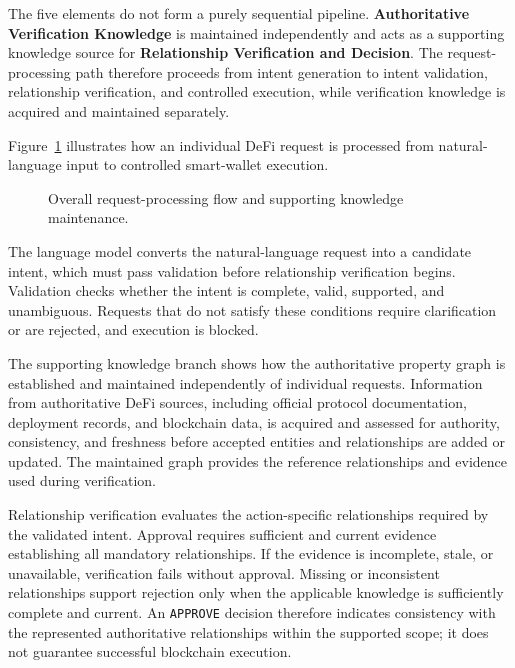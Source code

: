 The five elements do not form a purely sequential pipeline.
\textbf{Authoritative Verification Knowledge} is maintained independently and
acts as a supporting knowledge source for
\textbf{Relationship Verification and Decision}. The request-processing path
therefore proceeds from intent generation to intent validation, relationship
verification, and controlled execution, while verification knowledge is
acquired and maintained separately.

Figure~\ref{fig:overall_system_flow} illustrates how an individual DeFi
request is processed from natural-language input to controlled smart-wallet
    execution. 

\begin{figure}[H]
    \centering
    \resizebox{0.90\textwidth}{!}{%
    }
    \caption{Overall request-processing flow and supporting knowledge
    maintenance.}
    \label{fig:overall_system_flow}
\end{figure}
The language model converts the natural-language
request into a candidate intent, which must pass validation before
relationship verification begins. Validation checks whether the intent is
complete, valid, supported, and unambiguous. Requests that do not satisfy
these conditions require clarification or are rejected, and execution is
blocked.


The supporting knowledge branch shows how the authoritative property graph
is established and maintained independently of individual requests.
Information from authoritative DeFi sources, including official protocol
documentation, deployment records, and blockchain data, is acquired and
assessed for authority, consistency, and freshness before accepted entities
and relationships are added or updated. The maintained graph provides the
reference relationships and evidence used during verification.

Relationship verification evaluates the action-specific relationships
required by the validated intent. Approval requires sufficient and current
evidence establishing all mandatory relationships. If the evidence is
incomplete, stale, or unavailable, verification fails without approval.
Missing or inconsistent relationships support rejection only when the
applicable knowledge is sufficiently complete and current. An
\texttt{APPROVE} decision therefore indicates consistency with the
represented authoritative relationships within the supported scope; it does
not guarantee successful blockchain execution.

